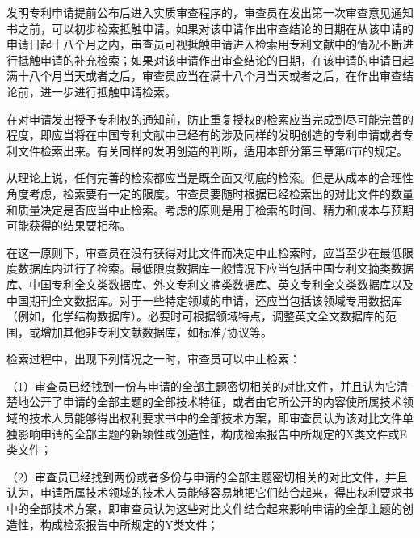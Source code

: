 发明专利申请提前公布后进入实质审查程序的，审查员在发出第一次审查意见通知书之前，可以初步检索抵触申请。如果对该申请作出审查结论的日期在从该申请的申请日起十八个月之内，审查员可视抵触申请进入检索用专利文献中的情况不断进行抵触申请的补充检索；如果对该申请作出审查结论的日期，在该申请的申请日起满十八个月当天或者之后，审查员应当在满十八个月当天或者之后，在作出审查结论前，进一步进行抵触申请检索。

在对申请发出授予专利权的通知前，防止重复授权的检索应当完成到尽可能完善的程度，即应当将在中国专利文献中已经有的涉及同样的发明创造的专利申请或者专利文件检索出来。有关同样的发明创造的判断，适用本部分第三章第6节的规定。

从理论上说，任何完善的检索都应当是既全面又彻底的检索。但是从成本的合理性角度考虑，检索要有一定的限度。审查员要随时根据已经检索出的对比文件的数量和质量决定是否应当中止检索。考虑的原则是用于检索的时间、精力和成本与预期可能获得的结果要相称。

在这一原则下，审查员在没有获得对比文件而决定中止检索时，应当至少在最低限度数据库内进行了检索。最低限度数据库一般情况下应当包括中国专利文摘类数据库、中国专利全文类数据库、外文专利文摘类数据库、英文专利全文类数据库以及中国期刊全文数据库。对于一些特定领域的申请，还应当包括该领域专用数据库（例如，化学结构数据库）。必要时可根据领域特点，调整英文全文数据库的范围，或增加其他非专利文献数据库，如标准/协议等。

检索过程中，出现下列情况之一时，审查员可以中止检索：

{\setlength{\parindent}{17.1bp}（1）审查员已经找到一份与申请的全部主题密切相关的对比文件，并且认为它清楚地公开了申请的全部主题的全部技术特征，或者由它所公开的内容使所属技术领域的技术人员能够得出权利要求书中的全部技术方案，即审查员认为该对比文件单独影响申请的全部主题的新颖性或创造性，构成检索报告中所规定的X类文件或E类文件；\par}

{\setlength{\parindent}{17.1bp}（2）审查员已经找到两份或者多份与申请的全部主题密切相关的对比文件，并且认为，申请所属技术领域的技术人员能够容易地把它们结合起来，得出权利要求书中的全部技术方案，即审查员认为这些对比文件结合起来影响申请的全部主题的创造性，构成检索报告中所规定的Y类文件；\par}

